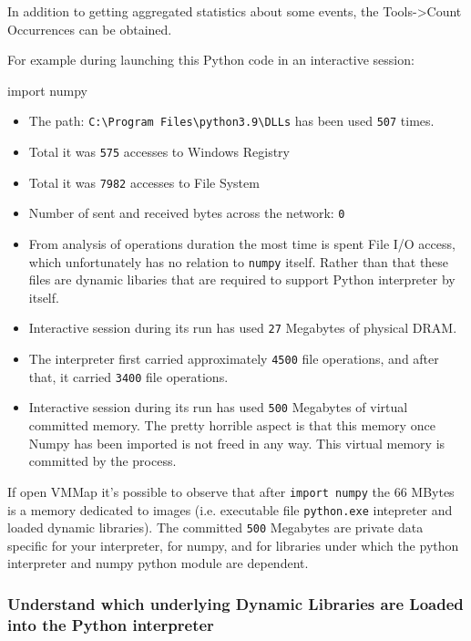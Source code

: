 \documentclass[
]{article}
\newenvironment{Shaded}{}{}
\newcommand{\ImportTok}[1]{#1}
\newcommand{\NormalTok}[1]{#1}
\begin{document}
In addition to getting aggregated statistics about some events, the
Tools-\textgreater Count Occurrences can be obtained.

For example during launching this Python code in an interactive session:

\begin{Shaded}
\begin{Highlighting}[]
\ImportTok{import}\NormalTok{ numpy}
\end{Highlighting}
\end{Shaded}

\begin{itemize}
\item
  The path:
  \texttt{C:\textbackslash{}Program\ Files\textbackslash{}python3.9\textbackslash{}DLLs}
  has been used \texttt{507} times.
\item
  Total it was \texttt{575} accesses to Windows Registry
\item
  Total it was \texttt{7982} accesses to File System
\item
  Number of sent and received bytes across the network: \texttt{0}
\item
  From analysis of operations duration the most time is spent File I/O
  access, which unfortunately has no relation to \texttt{numpy} itself.
  Rather than that these files are dynamic libaries that are required to
  support Python interpreter by itself.
\item
  Interactive session during its run has used \texttt{27} Megabytes of
  physical DRAM.
\item
  The interpreter first carried approximately \texttt{4500} file
  operations, and after that, it carried \texttt{3400} file operations.
\item
  Interactive session during its run has used \texttt{500} Megabytes of
  virtual committed memory. The pretty horrible aspect is that this
  memory once Numpy has been imported is not freed in any way. This
  virtual memory is committed by the process.
\end{itemize}

If open VMMap it's possible to observe that after \texttt{import\ numpy}
the 66 MBytes is a memory dedicated to images (i.e. executable file
\texttt{python.exe} intepreter and loaded dynamic libraries). The
committed \texttt{500} Megabytes are private data specific for your
interpreter, for numpy, and for libraries under which the python
interpreter and numpy python module are dependent.

\hypertarget{understand-which-underlying-dynamic-libraries-are-loaded-into-the-python-interpreter}{%
\subsubsection{Understand which underlying Dynamic Libraries are Loaded
into the Python
interpreter}\label{understand-which-underlying-dynamic-libraries-are-loaded-into-the-python-interpreter}}
\end{document}

